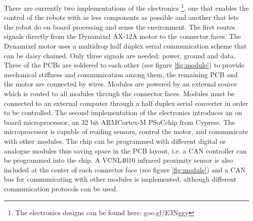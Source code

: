 \documentclass[sigconf]{acmart}
\begin{document}
There are currently two implementations of the electronics \footnote{The electronics designs can be found here: goo.gl/EJNggy}, one that enables the control of the robots with as less components as possible and another that lets the robot do on board processing and sense the environment. The first routes signals directly from the Dynamixel AX-12A motor to the connector faces. The Dynamixel motor uses a multidrop half duplex serial communication scheme that can be daisy chained. Only three signals are needed: power, ground and data. Three of the PCBs are soldered to each other (see figure \ref{fig:module}) to provide mechanical stiffness and communication among them, the remaining PCB and the motor are connected by wires. Modules are powered by an external source which is routed to all modules through the connector faces. Modules must be connected to an external computer through a half duplex serial converter in order to be controlled.
% 
% 
% 
% 
The second implementation of the electronics introduces an on board microprocessor, an 32 bit ARM\textregistered Cortex\textregistered-M PSoC\textregistered chip from Cypress. The microprocessor is capable of reading sensors, control the motor, and communicate with other modules. The chip can be programmed with different digital or analogue modules thus saving space in the PCB layout, i.e. a CAN controller can be programmed into the chip. A VCNL4010 infrared proximity sensor is also included at the center of each connector face (see figure \ref{fig:module}) and a CAN bus for communicating with other modules is implemented, although different communication protocols can be used. 
\end{document}
